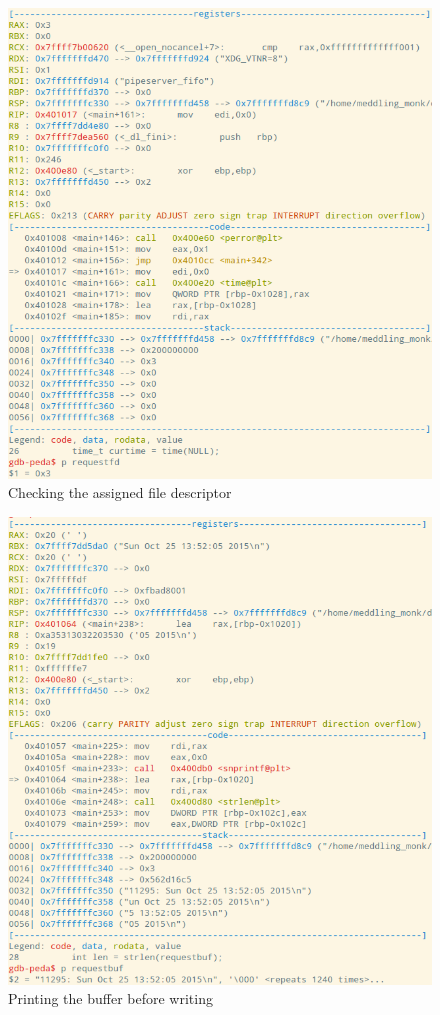 \documentclass[letter,12pt,sffamily]{article}
\begin{document}
\begin{figure}[H]
	\centering
	\includegraphics[width=1\linewidth]{./images/18}
	\caption[assigned_file_descriptor]{Checking the assigned file descriptor}
	\label{fig:19}
\end{figure}
\begin{figure}[H]
	\centering
	\includegraphics[width=1\linewidth]{./images/19}
	\caption[printing_buffer]{Printing the buffer before writing}
	\label{fig:20}
\end{figure}
\end{document}
